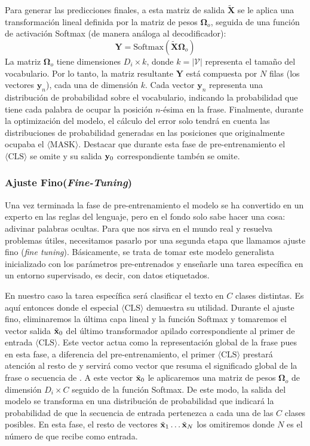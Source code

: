 Para generar las predicciones finales, a esta matriz de salida $\widetilde{\mathbf{X}}$ se le aplica una transformación lineal definida por la matriz de pesos $\mathbf{\Omega}_o$, seguida de una función de activación Softmax (de manera análoga al decodificador):
\begin{equation}
    \mathbf{Y} = \text{Softmax}(\widetilde{\mathbf{X}}\mathbf{\Omega}_o)
\end{equation}
La matriz $\mathbf{\Omega}_o$ tiene dimensiones $D_i \times k$, donde $k = |\mathcal{V}|$ representa el tamaño del vocabulario. Por lo tanto, la matriz resultante $\mathbf{Y}$ está compuesta por $N$ filas (los vectores $\mathbf{y}_n$), cada una de dimensión $k$. Cada vector $\mathbf{y}_n$ representa una distribución de probabilidad sobre el vocabulario, indicando la probabilidad que tiene cada palabra de ocupar la posición $n$-ésima en la frase. Finalmente, durante la optimización del modelo, el cálculo del error solo tendrá en cuenta las distribuciones de probabilidad generadas en las posiciones que originalmente ocupaba el \token{} $\langle \text{MASK} \rangle$. Destacar que durante esta fase de pre-entrenamiento el \token{} $\langle \text{CLS} \rangle$ se omite y su salida $\mathbf{y}_0$ correspondiente tambén se omite.


\subsubsection{Ajuste Fino(\textit{Fine-Tuning})}
Una vez terminada la fase de pre-entrenamiento el modelo se ha convertido en un experto en las reglas del lenguaje, pero en el fondo solo sabe hacer una cosa: adivinar palabras ocultas. Para que nos sirva en el mundo real y resuelva problemas útiles, necesitamos pasarlo por una segunda etapa que llamamos ajuste fino (\textit{fine tuning}). Básicamente, se trata de tomar este modelo generalista inicializado con los parámetros pre-entrenados y enseñarle una tarea específica en un entorno supervisado, es decir, con datos etiquetados.

En nuestro caso la tarea específica será clasificar el texto en $C$ clases distintas. Es aquí entonces donde el \token especial $\langle \text{CLS} \rangle$ demuestra su utilidad. Durante el ajuste fino, eliminaremos la última capa lineal y la función Softmax y tomaremos el vector salida $\Tilde{\mathbf{x}}_0$ del último transformador apilado correspondiente  al primer \token{} de entrada $\langle \text{CLS} \rangle$. Este vector actua como la representación global de la frase pues en esta fase, a diferencia del pre-entrenamiento, el primer \token{}  $\langle \text{CLS} \rangle$ prestará atención al resto de \tokens{} y servirá como vector que resuma el significado global de la frase o secuencia de \tokens{}. A este vector  $\Tilde{\mathbf{x}}_0$ le aplicaremos una matriz de pesos $\mathbf{\Omega}_o$ de dimensión $D_i \times C$ seguido de la función Softmax. De este modo, la salida del modelo se transforma en una distribución de probabilidad que indicará la probabilidad de que la secuencia de entrada pertenezca a cada una de las $C$ clases posibles. En esta fase, el resto de vectores $\Tilde{\mathbf{x}}_1 \dots \Tilde{\mathbf{x}}_N$ los omitiremos donde $N$ es el número de \tokens{} que recibe como entrada.

